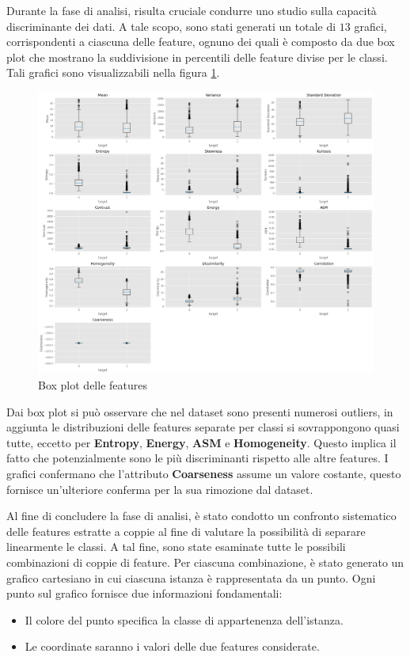 Durante la fase di analisi, risulta cruciale condurre uno studio sulla capacità
discriminante dei dati. A tale scopo, sono stati generati un totale di $13$
grafici, corrispondenti a ciascuna delle feature, ognuno dei quali è composto da 
due box plot che mostrano la suddivisione in percentili delle feature divise per 
le classi. Tali grafici sono visualizzabili nella figura \ref{fig:boxplot_features}.
\newpage
\begin{figure}[!ht]
      \centering
      \includegraphics[width=\textwidth]{img/analisi/boxplot.png}
      \caption{Box plot delle features}
      \label{fig:boxplot_features}
\end{figure}

Dai box plot si può osservare che nel dataset sono presenti numerosi outliers, in
aggiunta le distribuzioni delle features separate per classi si sovrappongono
quasi tutte, eccetto per \textbf{Entropy}, \textbf{Energy}, \textbf{ASM} e
\textbf{Homogeneity}. Questo implica il fatto che potenzialmente sono le più
discriminanti rispetto alle altre features. I grafici confermano che l'attributo
\textbf{Coarseness} assume un valore costante, questo fornisce un'ulteriore
conferma per la sua rimozione dal dataset.

Al fine di concludere la fase di analisi, è stato condotto un confronto
sistematico delle features estratte a coppie al fine di valutare la possibilità
di separare linearmente le classi. A tal fine, sono state esaminate tutte le
possibili combinazioni di coppie di feature. Per ciascuna combinazione, è stato
generato un grafico cartesiano in cui ciascuna istanza è rappresentata da un
punto. Ogni punto sul grafico fornisce due informazioni fondamentali:
\begin{itemize}
      \item Il colore del punto specifica la classe di appartenenza dell'istanza.
      \item Le coordinate saranno i valori delle due features considerate.
\end{itemize}


